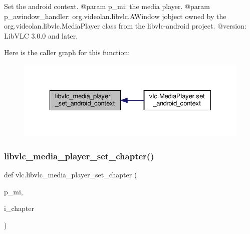 \begin{DoxyVerb}Set the android context.
@param p_mi: the media player.
@param p_awindow_handler: org.videolan.libvlc.AWindow jobject owned by the org.videolan.libvlc.MediaPlayer class from the libvlc-android project.
@version: LibVLC 3.0.0 and later.
\end{DoxyVerb}
 Here is the caller graph for this function\+:
\nopagebreak
\begin{figure}[H]
\begin{center}
\leavevmode
\includegraphics[width=329pt]{namespacevlc_ae9303e0d1bd96d748e62523a28d6c391_icgraph}
\end{center}
\end{figure}
\mbox{\label{namespacevlc_a4ab44fdaf74a35fb2faa8fa6eb11a367}} 
\subsubsection{\texorpdfstring{libvlc\+\_\+media\+\_\+player\+\_\+set\+\_\+chapter()}{libvlc\_media\_player\_set\_chapter()}}
{\footnotesize\ttfamily def vlc.\+libvlc\+\_\+media\+\_\+player\+\_\+set\+\_\+chapter (\begin{DoxyParamCaption}\item[{}]{p\+\_\+mi,  }\item[{}]{i\+\_\+chapter }\end{DoxyParamCaption})}


